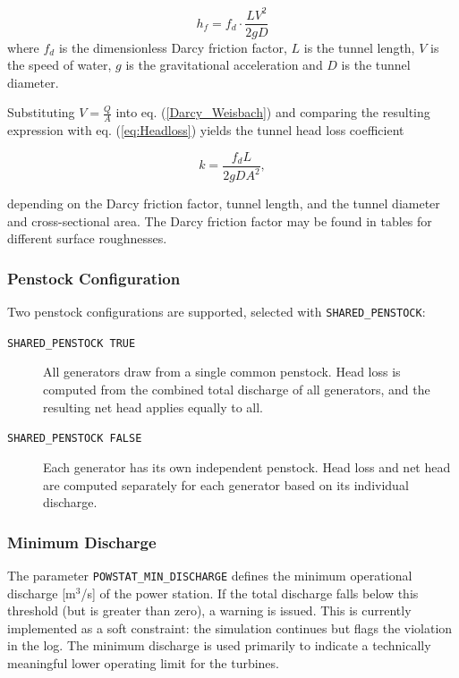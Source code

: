 \documentclass[a4paper, 12pt]{report}
\begin{document}
    \begin{equation}
        h_f=f_d \cdot \frac{LV^2}{2gD}
        \label{Darcy_Weisbach}
    \end{equation}
    where $f_d$ is the dimensionless Darcy friction factor, $L$ is the tunnel length, $V$ is the speed of water, $g$ is the gravitational acceleration and $D$ is the tunnel diameter. 

    Substituting $V=\frac{Q}{A}$ into eq. (\ref{Darcy_Weisbach}) and comparing the resulting expression with eq. (\ref{eq:Headloss}) yields the tunnel head loss coefficient

    \begin{equation}
        k = \frac{f_d L}{2 g D A^2},
        \label{eq:HEADLOSSCOEF}
    \end{equation}

    depending on the Darcy friction factor, tunnel length, and the tunnel diameter and cross-sectional area. The Darcy friction factor may be found in tables for different surface roughnesses.

	\subsubsection{Penstock Configuration}

	Two penstock configurations are supported, selected with \texttt{SHARED\_PENSTOCK}:

	\begin{description}
		\item[\texttt{SHARED\_PENSTOCK TRUE}] All generators draw from a single common penstock.
		Head loss is computed from the combined total discharge of all generators, and the
		resulting net head applies equally to all.
	
		\item[\texttt{SHARED\_PENSTOCK FALSE}] Each generator has its own independent penstock.
		Head loss and net head are computed separately for each generator based on its
		individual discharge.
	\end{description}


	\subsubsection{Minimum Discharge}

	The parameter \texttt{POWSTAT\_MIN\_DISCHARGE} defines the minimum operational discharge
	[m$^3$/s] of the power station. If the total discharge falls below this threshold (but is
	greater than zero), a warning is issued. This is currently implemented as a soft constraint:
	the simulation continues but flags the violation in the log. The minimum discharge is used
	primarily to indicate a technically meaningful lower operating limit for the turbines.
\end{document}
